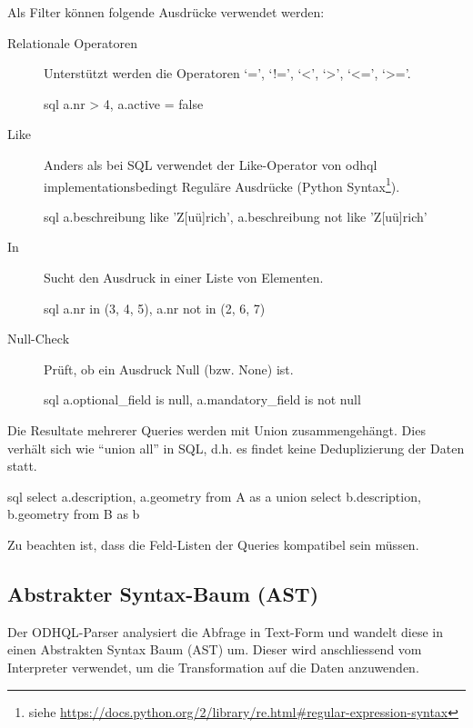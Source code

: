 Als Filter können folgende Ausdrücke verwendet werden:
\begin{description}
\item[Relationale Operatoren] Unterstützt werden die Operatoren `=', `!=', `<', `>', `<=', `>='.
\begin{src}{sql}
a.nr > 4, a.active = false
\end{src}
\item[Like] Anders als bei SQL verwendet der Like-Operator von \acs{odhql} implementationsbedingt Reguläre Ausdrücke (Python Syntax\footnote{siehe \url{https://docs.python.org/2/library/re.html\#regular-expression-syntax}}).
\begin{src}{sql}
a.beschreibung like 'Z[uü]rich', a.beschreibung not like 'Z[uü]rich'
\end{src}
\item[In] Sucht den Ausdruck in einer Liste von Elementen.
\begin{src}{sql}
a.nr in (3, 4, 5), a.nr not in (2, 6, 7)
\end{src}
\item[Null-Check] Prüft, ob ein Ausdruck Null (bzw. None) ist.
\begin{src}{sql}
a.optional_field is null, a.mandatory_field is not null
\end{src}
\end{description}

Die Resultate mehrerer Queries werden mit Union zusammengehängt. Dies verhält sich wie ``union all'' in SQL, d.h. es findet keine Deduplizierung der Daten statt.
\begin{src}{sql}
  select a.description, a.geometry from A as a
   union
  select b.description, b.geometry from B as b
\end{src}
Zu beachten ist, dass die Feld-Listen der Queries kompatibel sein müssen.
\newline

\subsection{Abstrakter Syntax-Baum (AST)}
Der ODHQL-Parser analysiert die Abfrage in Text-Form und wandelt diese in einen Abstrakten Syntax Baum (AST) um. Dieser wird anschliessend vom Interpreter verwendet, um die Transformation auf die Daten anzuwenden.

